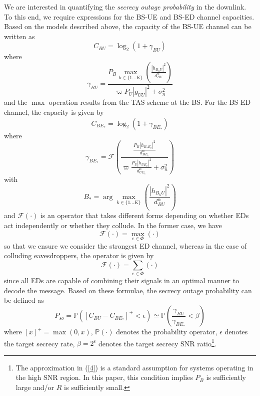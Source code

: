 \documentclass[10pt]{IEEEtran}
\begin{document}
We are interested in quantifying the \emph{secrecy outage probability} in the downlink.  To this end, we require expressions for the BS-UE and BS-ED channel capacities.  Based on the models described above, the capacity of the BS-UE channel can be written as
\begin{equation}\label{3a}
  C_{BU} = \log_2(1+\gamma_{BU})
\end{equation}
where
\begin{equation}\label{5}
\gamma_{BU}=\frac{P_B\underset{k\in \{1...K\}}{\max}\left(\frac{|h_{B_kU}|^2}{d^\alpha_{BU}}\right)}{\varpi P_U|g_{UU}|^2+\sigma_n^2}
\end{equation}
and the $\max$ operation results from the TAS scheme at the BS.  For the BS-ED channel, the capacity is given by
\begin{equation}\label{3b}
C_{BE_*} = \log_2(1+\gamma_{BE_*})
\end{equation}
where
\begin{equation}\label{6}
\gamma_{BE_*}= \mathcal{F}\!\left(\frac{\frac{P_B|h_{B_*E_e}|^2}{d^\alpha_{BE_e}}}{\varpi \frac{P_U|h_{UE_e}|^2}{d^\alpha_{UE_e}}+\sigma_n^2}\right)
\end{equation}
with
\begin{equation}
  B_* = \arg \underset{k\in \{1...K\}}{\max}\left(\frac{|h_{B_kU}|^2}{d^\alpha_{BU}}\right)
\end{equation}
and $\mathcal{F}(\cdot)$ is an operator that takes different forms depending on whether EDs act independently or whether they collude.  In the former case, we have
\begin{equation}\label{eq:F_ind}
  \mathcal F(\cdot) = \max_{e\in\Phi}(\cdot)
\end{equation}
so that we ensure we consider the strongest ED channel, whereas in the case of colluding eavesdroppers, the operator is given by
\begin{equation}\label{eq:F_coll}
  \mathcal F(\cdot) = \sum_{e\in\Phi}(\cdot)
\end{equation}
since all EDs are capable of combining their signals in an optimal manner to decode the message.  Based on these formulae, the secrecy outage probability can be defined as~\cite{P.C121}
\begin{equation} \label{4}
P_{so} = \mathbb{P}([C_{BU} - C_{BE_*}]^+< \epsilon) \simeq \mathbb{P}\left(\frac{\gamma_{BU}}{\gamma_{BE_*}}<\beta\right)
\end{equation}
where $[x]^+=\max(0,x)$, $\mathbb{P}(\cdot)$ denotes the probability operator, $\epsilon$ denotes the target secrecy rate, $\beta = 2^\epsilon$ denotes the target secrecy SNR ratio\footnote{The approximation in (\ref{4}) is a standard assumption for systems operating in the high SNR region.  In this paper, this condition implies $P_B$ is sufficiently large and/or $R$ is sufficiently small.}.
\end{document}
